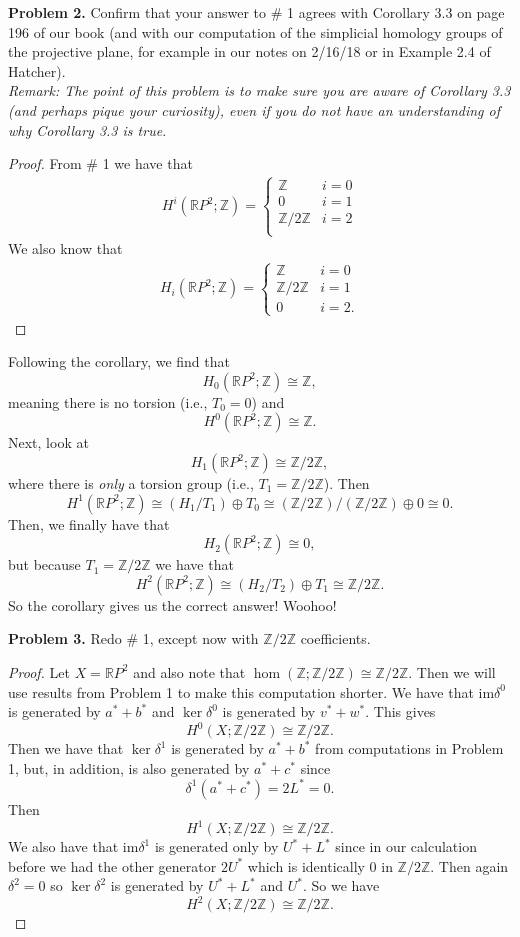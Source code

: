 \documentclass[leqno]{article}
\theoremstyle{nonumberplain}
\newtheorem{proof}{Proof}
\newcommand{\im}{\mathrm{im}}
\newcommand{\R}{\mathbb{R}}
\newcommand{\Z}{\mathbb{Z}}
\begin{document}
\vspace*{1cm}


\noindent\textbf{Problem 2.} 
Confirm that your answer to \# 1 agrees with Corollary 3.3 on page 196 of our book (and with our computation of the simplicial homology groups of the projective plane, for example in our notes on 2/16/18 or in Example 2.4 of Hatcher).\\

\noindent \emph{Remark: The point of this problem is to make sure you are aware of Corollary 3.3 (and perhaps pique your curiosity), even if you do not have an understanding of why Corollary 3.3 is true.}

\begin{proof}
From \# 1 we have that
\begin{align*}
H^i(\R P^2 ; \Z)= 
\begin{cases}
\Z & i=0\\
0 & i=1\\
\Z/2\Z & i=2\\
\end{cases}
\end{align*}
We also know that 
\begin{align*}
H_i(\R P^2 ; \Z)= 
\begin{cases}
\Z & i=0\\
\Z/2\Z & i=1\\
0 & i=2.
\end{cases}
\end{align*}
\end{proof}
Following the corollary, we find that
\[
H_0(\R P^2; \Z)\cong \Z,
\]
meaning there is no torsion (i.e., $T_0=0$) and 
\[
H^0(\R P^2 ; \Z) \cong \Z.
\]
Next, look at
\[
H_1(\R P^2; \Z) \cong \Z/2\Z,
\]
where there is \emph{only} a torsion group (i.e., $T_1=\Z/2\Z$).  Then
\[
H^1(\R P^2; \Z) \cong (H_1/T_1)\oplus T_{0} \cong (\Z/2\Z)/(\Z/2\Z)\oplus 0 \cong 0.
\]
Then, we finally have that
\[
H_2(\R P^2; \Z) \cong 0,
\]
but because $T_1=\Z/2\Z$ we have that
\[
H^2(\R P^2; \Z) \cong (H_2/T_2) \oplus T_1 \cong \Z/2\Z.
\]
So the corollary gives us the correct answer! Woohoo!


\vspace*{1cm}


\noindent\textbf{Problem 3.} 
Redo \# 1, except now with $\Z/2\Z$ coefficients.

\begin{proof}
Let $X=\R P^2$ and also note that $\hom(\Z;\Z/2\Z)\cong \Z/2\Z$.  Then we will use results from Problem 1 to make this computation shorter.  We have that $\im \delta^0$ is generated by $a^*+b^*$ and $\ker \delta^0$ is generated by $v^*+w^*$. This gives
\[
H^0(X;\Z/2\Z)\cong \Z/2\Z.
\]
Then we have that $\ker \delta^1$ is generated by $a^*+b^*$ from computations in Problem 1, but, in addition, is also generated by $a^*+c^*$ since 
\[
\delta^1 (a^*+c^*)=2L^*=0.
\]
Then
\[
H^1(X;\Z/2\Z) \cong \Z/2\Z.
\]
We also have that $\im \delta^1$ is generated only by $U^*+L^*$ since in our calculation before we had the other generator $2U^*$ which is identically 0 in $\Z/2\Z$. Then again $\delta^2=0$ so $\ker \delta^2$ is generated by $U^*+L^*$ and $U^*$. So we have
\[
H^2(X;\Z/2\Z)\cong \Z/2\Z.
\]
\end{proof}
\end{document}
